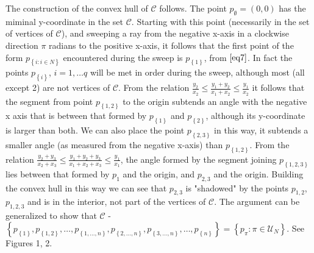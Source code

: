 \documentclass{article}
\theoremstyle{case}
\begin{document}
The construction of the convex hull of $\mathcal{C}$ follows. The point $p_{\emptyset} = \left(0,0\right)$ has the miminal y-coordinate in the set $\mathcal{C}$. Starting with this point (necessarily in the set of vertices of $\mathcal{C}$), and sweeping a ray from the negative x-axis in a clockwise direction $\pi$ radians to the positive x-axis, it follows that the first point of the form $p_{\left\lbrace i \colon i \in N\right\rbrace}$ encountered during the sweep is $p_{\left\lbrace 1 \right\rbrace}$, from $\ref{eq7}$. In fact the points $p_{\left\lbrace i \right\rbrace}$, $i =1, \dots q$ will be met in order during the sweep, although most (all except 2) are not vertices of $\mathcal{C}$. From the relation $\frac{y_2}{x_2} \leq \frac{y_1+y_2}{x_1+x_2} \leq \frac{y_1}{x_2}$ it follows that the segment from point $p_{\left\lbrace 1,2 \right\rbrace}$ to the origin subtends an angle with the negative x axis that is between that formed by $p_{\left\lbrace 1 \right\rbrace}$ and $p_{\left\lbrace 2 \right\rbrace}$, although its y-coordinate is larger than both. We can also place the point $p_{\left\lbrace 2,3 \right\rbrace}$ in this way, it subtends a smaller angle (as measured from the negative x-axis) than $p_{\left\lbrace 1,2 \right\rbrace}$. From the relation $\frac{y_2+y_3}{x_2+x_3} \leq \frac{y_1+y_2+y_3}{x_1+x_2+x_3} \leq \frac{y_1}{x_1}$, the angle formed by the segment joining $p_{\left\lbrace 1, 2, 3\right\rbrace}$ lies between that formed by $p_{1}$ and the origin, and $p_{2,3}$ and the origin. Building the convex hull in this way we can see that $p_{2,3}$ is "shadowed" by the points $p_{1,2}$, $p_{1,2,3}$ and is in the interior, not part of the vertices of $\mathcal{C}$. The argument can be generalized to show that $\mathcal{C}$ - $\left\lbrace p_{\left\lbrace 1\right\rbrace}, p_{\left\lbrace 1,2 \right\rbrace}, \dots, p_{\left\lbrace 1, \dots, n\right\rbrace}, p_{\left\lbrace 2, \dots, n\right\rbrace}, p_{\left\lbrace 3, \dots, n\right\rbrace}, \dots, p_{\left\lbrace n\right\rbrace}\right\rbrace = \left\lbrace p_{\pi} \colon \pi \in \mathcal{U}_N\right\rbrace$. See Figures 1, 2.
\end{document}
